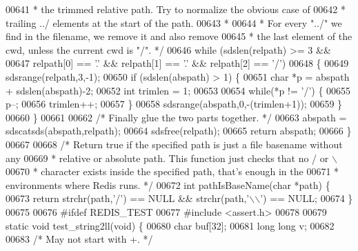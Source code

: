 \begin{DoxyCode}
{{{00641 \textcolor{comment}{     * the trimmed relative path. Try to normalize the obvious case of}
00642 \textcolor{comment}{     * trailing ../ elements at the start of the path.}
00643 \textcolor{comment}{     *}
00644 \textcolor{comment}{     * For every "../" we find in the filename, we remove it and also remove}
00645 \textcolor{comment}{     * the last element of the cwd, unless the current cwd is "/". */}
00646     \textcolor{keywordflow}{while} (sdslen(relpath) >= 3 &&
00647            relpath[0] == \textcolor{stringliteral}{'.'} && relpath[1] == \textcolor{stringliteral}{'.'} && relpath[2] == \textcolor{stringliteral}{'/'})
00648     \{
00649         sdsrange(relpath,3,-1);
00650         \textcolor{keywordflow}{if} (sdslen(abspath) > 1) \{
00651             \textcolor{keywordtype}{char} *p = abspath + sdslen(abspath)-2;
00652             \textcolor{keywordtype}{int} trimlen = 1;
00653 
00654             \textcolor{keywordflow}{while}(*p != \textcolor{stringliteral}{'/'}) \{
00655                 p--;
00656                 trimlen++;
00657             \}
00658             sdsrange(abspath,0,-(trimlen+1));
00659         \}
00660     \}
00661 
00662     \textcolor{comment}{/* Finally glue the two parts together. */}
00663     abspath = sdscatsds(abspath,relpath);
00664     sdsfree(relpath);
00665     \textcolor{keywordflow}{return} abspath;
00666 \}
00667 
00668 \textcolor{comment}{/* Return true if the specified path is just a file basename without any}
00669 \textcolor{comment}{ * relative or absolute path. This function just checks that no / or \(\backslash\)}
00670 \textcolor{comment}{ * character exists inside the specified path, that's enough in the}
00671 \textcolor{comment}{ * environments where Redis runs. */}
00672 \textcolor{keywordtype}{int} pathIsBaseName(\textcolor{keywordtype}{char} *path) \{
00673     \textcolor{keywordflow}{return} strchr(path,\textcolor{stringliteral}{'/'}) == NULL && strchr(path,\textcolor{stringliteral}{'\(\backslash\)\(\backslash\)'}) == NULL;
00674 \}
00675 
00676 \textcolor{preprocessor}{#}\textcolor{preprocessor}{ifdef} \textcolor{preprocessor}{REDIS\_TEST}
00677 \textcolor{preprocessor}{#}\textcolor{preprocessor}{include} \textcolor{preprocessor}{<}\textcolor{preprocessor}{assert}\textcolor{preprocessor}{.}\textcolor{preprocessor}{h}\textcolor{preprocessor}{>}
00678 
00679 \textcolor{keyword}{static} \textcolor{keywordtype}{void} test\_string2ll(\textcolor{keywordtype}{void}) \{
00680     \textcolor{keywordtype}{char} buf[32];
00681     \textcolor{keywordtype}{long} \textcolor{keywordtype}{long} v;
00682 
00683     \textcolor{comment}{/* May not start with +. */}
}}}
\end{DoxyCode}
